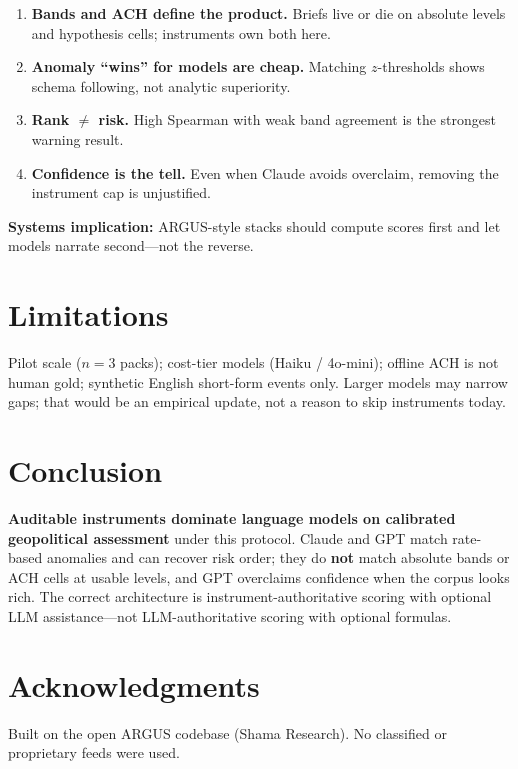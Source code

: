 \documentclass[11pt,a4paper]{article}
\begin{document}
\begin{enumerate}
  \item \textbf{Bands and ACH define the product.} Briefs live or die on absolute levels and hypothesis cells; instruments own both here.
  \item \textbf{Anomaly ``wins'' for models are cheap.} Matching $z$-thresholds shows schema following, not analytic superiority.
  \item \textbf{Rank $\neq$ risk.} High Spearman with weak band agreement is the strongest warning result.
  \item \textbf{Confidence is the tell.} Even when Claude avoids overclaim, removing the instrument cap is unjustified.
\end{enumerate}

\noindent\textbf{Systems implication:}
ARGUS-style stacks should compute scores first and let models narrate second---not the reverse.

\section{Limitations}

Pilot scale ($n{=}3$ packs); cost-tier models (Haiku / 4o-mini); offline ACH is not human gold;
synthetic English short-form events only.
Larger models may narrow gaps; that would be an empirical update, not a reason to skip instruments today.

\section{Conclusion}

\textbf{Auditable instruments dominate language models on calibrated geopolitical assessment}
under this protocol.
Claude and GPT match rate-based anomalies and can recover risk order; they do \textbf{not} match
absolute bands or ACH cells at usable levels, and GPT overclaims confidence when the corpus looks rich.
The correct architecture is instrument-authoritative scoring with optional LLM assistance---not
LLM-authoritative scoring with optional formulas.

\section*{Acknowledgments}
Built on the open ARGUS codebase (Shama Research).
No classified or proprietary feeds were used.



\end{document}
